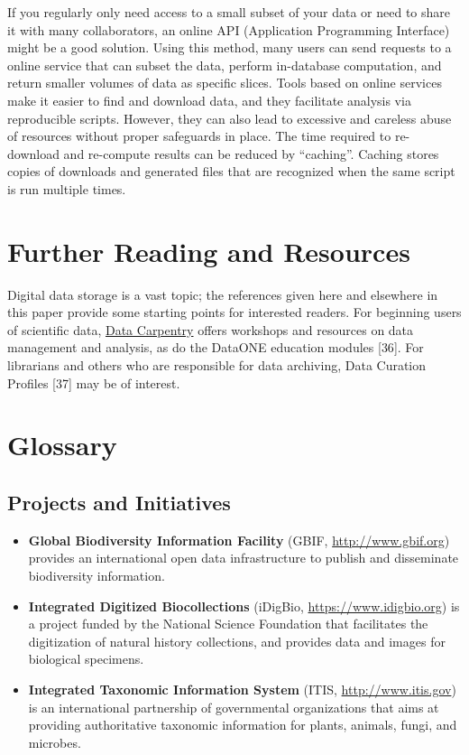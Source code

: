 \documentclass[10pt,letterpaper]{article}
\begin{document}
If you regularly only need access to a small subset of your data or need
to share it with many collaborators, an online API (Application
Programming Interface) might be a good solution. Using this method, many
users can send requests to a online service that can subset the data,
perform in-database computation, and return smaller volumes of data as
specific slices. Tools based on online services make it easier to find
and download data, and they facilitate analysis via reproducible
scripts. However, they can also lead to excessive and careless abuse of
resources without proper safeguards in place. The time required to
re-download and re-compute results can be reduced by ``caching''.
Caching stores copies of downloads and generated files that are
recognized when the same script is run multiple times.

\section*{Further Reading and
Resources}\label{further-reading-and-resources}

Digital data storage is a vast topic; the references given here and
elsewhere in this paper provide some starting points for interested
readers. For beginning users of scientific data,
\href{http://datacarpentry.org}{Data Carpentry} offers workshops and
resources on data management and analysis, as do the DataONE education
modules {[}36{]}. For librarians and others who are responsible for data
archiving, Data Curation Profiles {[}37{]} may be of interest.

\section*{Glossary}\label{glossary}

\subsection*{Projects and Initiatives}\label{projects-and-initiatives}

\begin{itemize}
\item
  \textbf{Global Biodiversity Information Facility} (GBIF,
  \url{http://www.gbif.org}) provides an international open data
  infrastructure to publish and disseminate biodiversity information.
\item
  \textbf{Integrated Digitized Biocollections} (iDigBio,
  \url{https://www.idigbio.org}) is a project funded by the National
  Science Foundation that facilitates the digitization of natural
  history collections, and provides data and images for biological
  specimens.
\item
  \textbf{Integrated Taxonomic Information System} (ITIS,
  \url{http://www.itis.gov}) is an international partnership of
  governmental organizations that aims at providing authoritative
  taxonomic information for plants, animals, fungi, and microbes.
\end{itemize}
\end{document}
